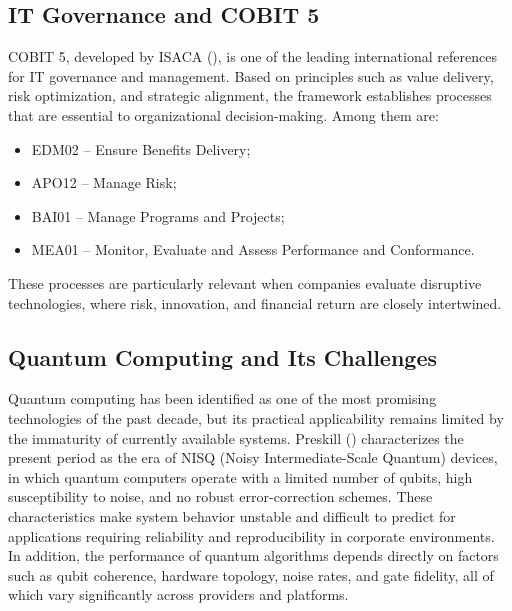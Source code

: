 \documentclass{icis}
\begin{document}
\subsection{IT Governance and COBIT 5}
COBIT 5, developed by ISACA (\citeyear{isaca2012a,isaca2012b,isaca2012c}), is one of the leading international references for IT governance and management. Based on principles such as value delivery, risk optimization, and strategic alignment, the framework establishes processes that are essential to organizational decision-making. Among them are:
\begin{itemize}[leftmargin=*]
    \item EDM02 -- Ensure Benefits Delivery;
    \item APO12 -- Manage Risk;
    \item BAI01 -- Manage Programs and Projects;
    \item MEA01 -- Monitor, Evaluate and Assess Performance and Conformance.
\end{itemize}
These processes are particularly relevant when companies evaluate disruptive technologies, where risk, innovation, and financial return are closely intertwined.

\subsection{Quantum Computing and Its Challenges}
Quantum computing has been identified as one of the most promising technologies of the past decade, but its practical applicability remains limited by the immaturity of currently available systems. Preskill (\citeyear{preskill2018}) characterizes the present period as the era of NISQ (Noisy Intermediate-Scale Quantum) devices, in which quantum computers operate with a limited number of qubits, high susceptibility to noise, and no robust error-correction schemes. These characteristics make system behavior unstable and difficult to predict for applications requiring reliability and reproducibility in corporate environments. In addition, the performance of quantum algorithms depends directly on factors such as qubit coherence, hardware topology, noise rates, and gate fidelity, all of which vary significantly across providers and platforms.
\end{document}
